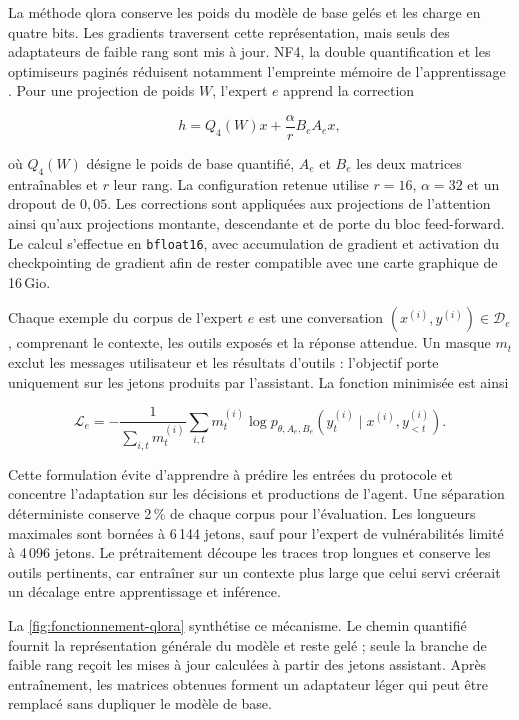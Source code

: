 La méthode \gls{qlora} conserve les poids du modèle de base gelés et les charge
en quatre bits. Les gradients traversent cette représentation, mais seuls des
adaptateurs de faible rang sont mis à jour. NF4, la double quantification et les
optimiseurs paginés réduisent notamment l'empreinte mémoire de l'apprentissage
\cite{dettmers2023qlora}. Pour une projection de poids \(W\), l'expert \(e\)
apprend la correction

\[
  h = Q_{4}(W)x + \frac{\alpha}{r} B_e A_e x,
\]

où \(Q_{4}(W)\) désigne le poids de base quantifié, \(A_e\) et \(B_e\) les deux
matrices entraînables et \(r\) leur rang. La configuration retenue utilise
\(r=16\), \(\alpha=32\) et un dropout de \(0{,}05\). Les corrections sont
appliquées aux projections de l'attention ainsi qu'aux projections montante,
descendante et de porte du bloc feed-forward. Le calcul s'effectue en
\texttt{\footnotesize bfloat16}, avec accumulation de gradient et activation du
checkpointing de gradient afin de rester compatible avec une carte graphique
de 16\,Gio.

Chaque exemple du corpus de l'expert \(e\) est une conversation
\((x^{(i)},y^{(i)})\in\mathcal{D}_e\), comprenant le contexte, les outils exposés
et la réponse attendue. Un masque \(m_t\) exclut les messages utilisateur et les
résultats d'outils : l'objectif porte uniquement sur les jetons produits par
l'assistant. La fonction minimisée est ainsi

\[
  \mathcal{L}_e =
  -\frac{1}{\sum_{i,t}m_t^{(i)}}
  \sum_{i,t}m_t^{(i)}
  \log p_{\theta,A_e,B_e}
  \left(y_t^{(i)}\mid x^{(i)},y_{<t}^{(i)}\right).
\]

Cette formulation évite d'apprendre à prédire les entrées du protocole et
concentre l'adaptation sur les décisions et productions de l'agent. Une
séparation déterministe conserve 2\,\% de chaque corpus pour l'évaluation. Les
longueurs maximales sont bornées à 6\,144 jetons, sauf pour l'expert de
vulnérabilités limité à 4\,096 jetons. Le prétraitement découpe les traces trop
longues et conserve les outils pertinents, car entraîner sur un contexte plus
large que celui servi créerait un décalage entre apprentissage et inférence.

La \cref{fig:fonctionnement-qlora} synthétise ce mécanisme. Le chemin quantifié
fournit la représentation générale du modèle et reste gelé ; seule la branche
de faible rang reçoit les mises à jour calculées à partir des jetons assistant.
Après entraînement, les matrices obtenues forment un adaptateur léger qui peut
être remplacé sans dupliquer le modèle de base.

